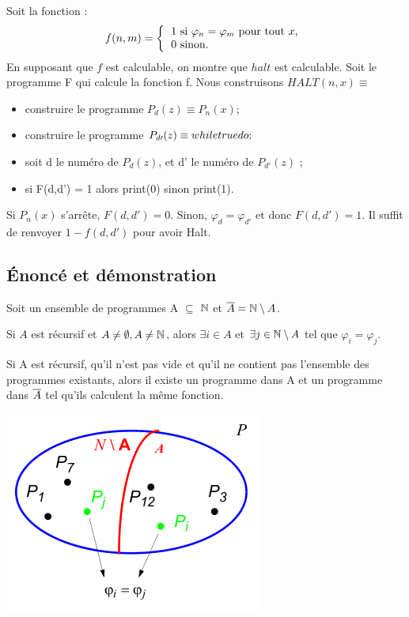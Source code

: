 \begin{myexem}
Soit la fonction :
\begin{equation*}
f(n,m) =\left\{\begin{tabular}{l}
		$1$ si $\varphi_n=\varphi_m$ pour tout $x$,\\
        $0$ sinon.
	\end{tabular}\right.
\end{equation*}
En supposant que $f$ est calculable, on montre que $halt$ est calculable. Soit le programme F qui calcule la fonction f. Nous construisons $ HALT(n,x) \equiv $
		\begin{itemize}
		\item construire le programme $P_{d}(z) \equiv P_{n}(x); $
		\item construire le programme $P_{d\prime}(z) \equiv \lstinline{while true do;} $
		\item soit d le numéro de $P_{d}(z)$, et d' le numéro de $P_{d\prime}(z)$ ;
		\item si F(d,d') = 1 alors print(0) sinon print(1).
		\end{itemize}

Si $P_n(x)$ s'arrête, $F(d,d')=0$. Sinon, $\varphi_{d}=\varphi_{d'}$ et donc $F(d,d')=1$. Il suffit de renvoyer $1-f(d,d')$ pour avoir Halt.
\end{myexem}

\subsection{Énoncé et démonstration}

Soit un ensemble de programmes A $\subseteq$ $\mathbb{N}$ et $\overline{A} = \mathbb{N} \setminus A$.

\begin{mytheo}[Rice]
	Si $A$ est récursif et $A\neq \emptyset, A \neq \mathbb{N}$,
  alors $\exists i \in A$ et $\exists j \in \mathbb{N} \setminus A$ tel que $\varphi _i = \varphi _j$.
	
	Si A est récursif, qu'il n'est pas vide et qu'il ne contient pas l'ensemble des programmes existants, 
  alors il existe un programme dans A et un programme dans $\overline{A}$ tel qu'ils calculent la même fonction. 

\end{mytheo}

\begin{center}
\includegraphics[scale=0.5]{Images/rice.png}
\end{center}

